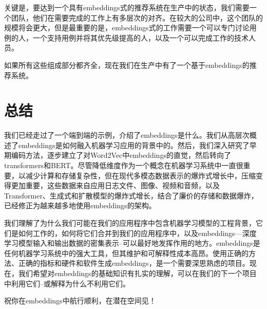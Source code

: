 \documentclass[Chinese, 11pt, table]{diazessay} %
\begin{document}
\begin{CJK}{UTF8}{gbsn}
\begin{sloppypar}
关键是，要达到一个具有embeddings式的推荐系统在生产中的状态，我们需要一个团队，他们在需要完成的工作上有多层次的对齐。在较大的公司中，这个团队的规模将会更大，但是最重要的是，embeddings式的工作需要一个可以专门讨论用例的人，一个支持用例并将其优先级提高的人，以及一个可以完成工作的技术人员\citep{meil2023ai}。

如果所有这些组成部分都齐全，现在我们在生产中有了一个基于embeddings的推荐系统。


\section{总结}

我们已经走过了一个端到端的示例，介绍了embeddings是什么。我们从高层次概述了embeddings是如何融入机器学习应用的背景中的。然后，我们深入研究了早期编码方法，逐步建立了对Word2Vec中embeddings的直觉，然后转向了transformers和BERT。尽管降低维度作为一个概念在机器学习系统中一直很重要，以减少计算和存储复杂性，但在现代多模态数据表示的爆炸式增长中，压缩变得更加重要，这些数据来自应用日志文件、图像、视频和音频，以及Transformer、生成式和扩散模型的爆炸式增长，结合了廉价的存储和数据爆炸，已经修正为越来越多地使用embeddings的架构。

我们理解了为什么我们可能在我们的应用程序中包含机器学习模型的工程背景，它们是如何工作的，如何将它们合并到我们的应用程序中，以及embeddings---深度学习模型输入和输出数据的密集表示--可以最好地发挥作用的地方。embeddings是任何机器学习系统中的强大工具，但其维护和可解释性成本高昂。使用正确的方法、正确的指标和硬件和软件生成embeddings，是一个需要深思熟虑的项目。现在，我们希望对embeddings的基础知识有扎实的理解，可以在我们的下一个项目中利用它们--或解释为什么不利用它们。

祝你在embeddings中航行顺利，在潜在空间见！

\newpage


\newpage



\end{sloppypar}
\end{CJK}
\end{document}
